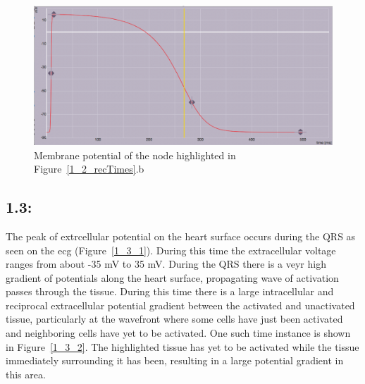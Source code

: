 \documentclass[12pt]{article}
\begin{document}
\begin{figure}[H]
	\centering
	\includegraphics[width=.95\linewidth]{Figures/1_2_actpotential.png}
	
	\caption{Membrane potential of the node highlighted in Figure~\ref{1_2_recTimes}.b}
	\label{1_2_vm}
\end{figure}


\subsection{1.3: }
The peak of extrcellular potential on the heart surface occurs during the QRS as seen on the ecg (Figure~\ref{1_3_1}). During this time the extracellular voltage ranges from about -35 mV to 35 mV. During the QRS there is a veyr high gradient of potentials along the heart surface, propagating wave of activation passes through the tissue. During this time there is a large intracellular and reciprocal extracellular potential gradient between the activated and unactivated tissue, particularly at the wavefront where some cells have just been activated and neighboring cells have yet to be activated. One such time instance is shown in Figure~\ref{1_3_2}. The highlighted tissue has yet to be activated while the tissue immediately surrounding it has been, resulting in a large potential gradient in this area.
\end{document}
